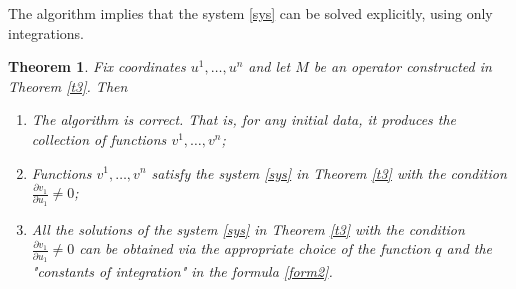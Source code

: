 \documentclass[12pt]{article}
\newtheorem{Theorem}{Theorem}
\theoremstyle{remark}
\newcommand{\pd}[2]{\frac{\partial#1}{\partial#2}}
\begin{document}
The algorithm implies that the system \eqref{sys} can be solved explicitly, using only integrations.

\begin{Theorem}\label{t4}
Fix coordinates $u^1, \dots, u^n$ and let $M$ be an operator constructed in Theorem \ref{t3}. Then
\begin{enumerate}
    \item The algorithm is correct. That is, for any initial data, it produces the collection of functions $v^1, \dots, v^n$;
    \item Functions $v^1, \dots, v^n$ satisfy the system \eqref{sys} in Theorem \ref{t3} with the condition $\pd{v_1}{u_1} \neq 0$;
    \item All the solutions of the system \eqref{sys} in Theorem \ref{t3} with the condition $\pd{v_1}{u_1} \neq 0$ can be obtained via the appropriate choice of the function $q$ and the "constants of integration" in the formula \eqref{form2}.
\end{enumerate}
\end{Theorem}
\end{document}
